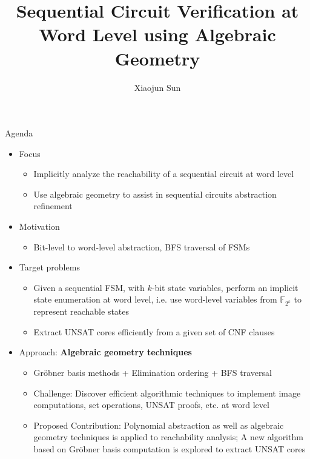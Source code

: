 \documentclass[xcolor=dvipsnames]{beamer}
\title[Ph.D Proposal]{Sequential Circuit Verification at Word Level using Algebraic Geometry}
\author[Xiaojun Sun]{Xiaojun Sun}
\institute[Univ. of Utah]{
Ph.D Candidate\\
Electrical and Computer Engineering, University of Utah\\
xiaojuns@ece.utah.edu\\
\ \\
\ \\
{\bf Ph.D's Dissertation Proposal}\\
}
\date{}
\newcommand{\Fkk}{{\mathbb{F}}_{2^k}}
\newcommand{\Grobner}{Gr\"{o}bner\xspace}
\begin{document}
\begin{frame}[plain]
  \titlepage

\end{frame}



\begin{frame}{\large{Agenda}}

\begin{itemize}
\item Focus
	\begin{itemize}
	\item Implicitly analyze the reachability of a sequential circuit at word level
	\item Use algebraic geometry to assist in sequential circuits abstraction refinement
	\end{itemize}
\item Motivation
	\begin{itemize}
	\item Bit-level to word-level abstraction, BFS traversal of FSMs
	\end{itemize}
\item Target problems 
	\begin{itemize}
	\item Given a sequential FSM, with $k$-bit state variables,
     perform an implicit state enumeration at word level, i.e. use word-level variables from $\Fkk$ to represent reachable states
        \item Extract UNSAT cores efficiently from a given set of CNF clauses
	\end{itemize}
\item Approach: {\bf Algebraic geometry techniques}
	\begin{itemize}
	\item  \Grobner basis methods + Elimination ordering + BFS traversal
        \item  Challenge: Discover efficient algorithmic techniques to implement image computations, 
        set operations, UNSAT proofs, etc. at word level
        \item  Proposed Contribution: Polynomial abstraction as well as algebraic geometry techniques 
        is applied to reachability analysis; A new algorithm based on \Grobner basis computation is explored to extract UNSAT cores
	\end{itemize}
\end{itemize}
\end{frame}
\end{document}
